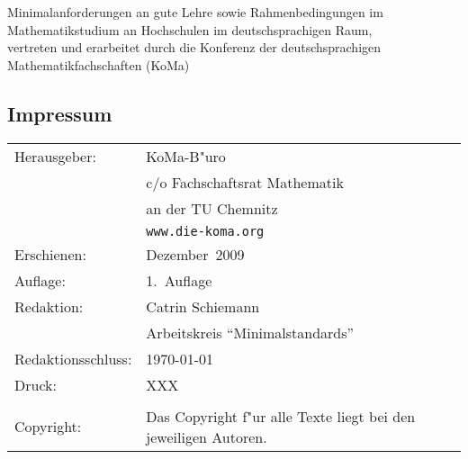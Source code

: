 \newpage
\vspace*{5cm}

\begin{center}
	Minimalanforderungen an gute Lehre sowie Rahmenbedingungen im Mathematikstudium
	an Hochschulen im deutschsprachigen Raum,\\
	vertreten und erarbeitet durch die Konferenz der deutschsprachigen Mathematikfachschaften (KoMa)
\end{center}

\vfill
\subsection*{Impressum}

\begin{table}[h]
\footnotesize
		\begin{tabular}{ll}
		Herausgeber:				& KoMa-B"uro \\
									& c/o Fachschaftsrat Mathematik \\
									& an der TU Chemnitz \\
									& \texttt{www.die-koma.org} \\
		Erschienen:					& Dezember~2009 \\
		Auflage:					& 1.~Auflage\\
		Redaktion:					& Catrin Schiemann \\
									& Arbeitskreis "`Minimalstandards"'\\ 
		Redaktionsschluss:			& \today \\
		Druck:						& XXX \\
												& \\
		Copyright:					& Das Copyright f"ur alle Texte liegt bei den jeweiligen Autoren. \\
		\end{tabular}
\end{table}